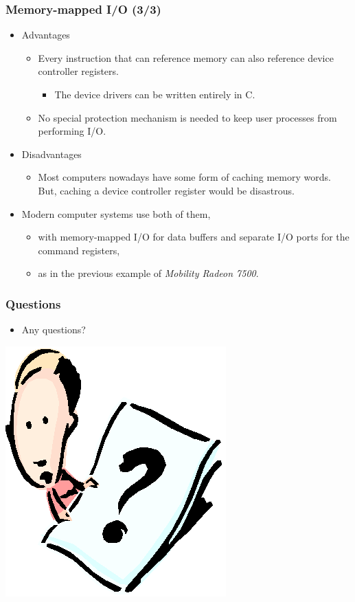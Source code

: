\documentclass[CJKutf8,xcolor=pdftex,dvipsnames,table]{beamer}
\begin{document}
\begin{CJK*}{UTF8}{song}
  \begin{frame}
    \frametitle{Memory-mapped I/O (3/3)} \pause
    \begin{itemize}
    \item{Advantages} \pause
      \begin{itemize}
      \item{Every instruction that can reference memory can also reference device controller registers.} \pause
        \begin{itemize}
        \item{The device drivers can be written entirely in C.} \pause
        \end{itemize}
      \item{No special protection mechanism is needed to keep user processes from performing I/O.} \pause
      \end{itemize}
    \item{Disadvantages} \pause
      \begin{itemize}
      \item{Most computers nowadays have some form of caching memory words. But, \pause caching a device controller register would be disastrous.} \pause
      \end{itemize}
    \item{Modern computer systems use both of them,} \pause
      \begin{itemize}
      \item{with memory-mapped I/O for data buffers and separate I/O ports for the command registers,} \pause
      \item{as in the previous example of \emph{Mobility Radeon 7500}.}
      \end{itemize}
    \end{itemize}
  \end{frame}

  \begin{frame}
    \frametitle{Questions}
    \begin{itemize}
    \item{Any questions?}
    \end{itemize}
    \begin{center}
      \includegraphics[scale=.5]{question}
    \end{center}
  \end{frame}


\end{CJK*}
\end{document}
